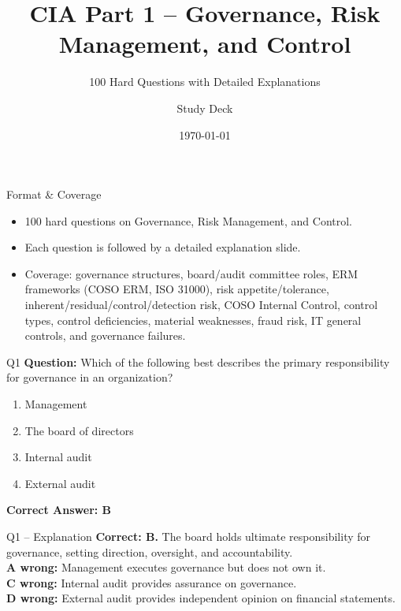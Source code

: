 \documentclass[aspectratio=169,10pt]{beamer}
\title{CIA Part 1 -- Governance, Risk Management, and Control}
\subtitle{100 Hard Questions with Detailed Explanations}
\author{Study Deck}
\date{\today}
\begin{document}
	
	\begin{frame}
		\titlepage
	\end{frame}
	
	\begin{frame}{Format \& Coverage}
		\small
		\begin{itemize}
			\item 100 hard questions on Governance, Risk Management, and Control.
			\item Each question is followed by a detailed explanation slide.
			\item Coverage: governance structures, board/audit committee roles,
			ERM frameworks (COSO ERM, ISO 31000), risk appetite/tolerance,
			inherent/residual/control/detection risk, COSO Internal Control,
			control types, control deficiencies, material weaknesses,
			fraud risk, IT general controls, and governance failures.
		\end{itemize}
	\end{frame}
	
	\begin{frame}[t]{Q1}
		\small
		\textbf{Question:} Which of the following best describes the primary responsibility for governance in an organization?
		\begin{enumerate}[label=\Alph*.,itemsep=1pt,topsep=2pt]
			\item Management
			\item The board of directors
			\item Internal audit
			\item External audit
		\end{enumerate}
		\vspace{4pt}
		\textbf{Correct Answer: B}
	\end{frame}
	
	\begin{frame}[t]{Q1 -- Explanation}
		\small
		\textbf{Correct: B.} The board holds ultimate responsibility for governance, setting direction, oversight, and accountability. \\[4pt]
		\textbf{A wrong:} Management executes governance but does not own it. \\[2pt]
		\textbf{C wrong:} Internal audit provides assurance on governance. \\[2pt]
		\textbf{D wrong:} External audit provides independent opinion on financial statements.
	\end{frame}
	
\end{document}
